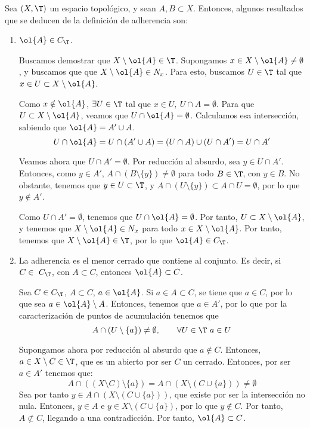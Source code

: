 Sea $(X,\T)$ un espacio topológico, y sean $A,B\subset X$. Entonces, algunos resultados que se deducen de la definición de adherencia son:
\begin{enumerate}
    \item $\ol{A}\in C_\T$.

    Buscamos demostrar que $X\setminus \ol{A}\in \T$. Supongamos $x\in X\setminus \ol{A}\neq \emptyset$, y buscamos que que $X\setminus \ol{A}\in N_x$. Para esto, buscamos $U\in \T$ tal que $x\in U\subset X\setminus \ol{A}$.
    
    Como $x\notin \ol{A}$, $\exists U\in \T$ tal que $x\in U,~U\cap A=\emptyset$. Para que $U\subset X\setminus \ol{A}$, veamos que $U\cap \ol{A}=\emptyset$.  Calculamos esa intersección, sabiendo que $\ol{A}=A'\cup A$.
    \begin{equation*}
        U\cap \ol{A} = U\cap (A'\cup A) = (U\cap A)\cup (U\cap A')=U\cap A'
    \end{equation*}

    Veamos ahora que $U\cap A'=\emptyset$. Por reducción al absurdo, sea $y\in U\cap A'$. Entonces, como $y\in A'$, $A\cap (B\setminus \{y\})\neq \emptyset$ para todo $B\in \T$, con $y\in B$. No obstante, tenemos que $y\in U\subset \T$, y $A\cap (U\setminus \{y\})\subset A\cap U=\emptyset$, por lo que $y\notin A'$.

    Como $U\cap A'=\emptyset$, tenemos que $U\cap \ol{A}=\emptyset$. Por tanto, $U\subset X\setminus \ol{A}$, y tenemos que $X\setminus \ol{A}\in N_x$ para todo $x\in X\setminus \ol{A}$. Por tanto, tenemos que $X\setminus \ol{A}\in \T$, por lo que $\ol{A}\in C_\T$.
    
    \item La adherencia es el menor cerrado que contiene al conjunto. Es decir, si $C\in~C_\T$, con $A\subset C$, entonces $\ol{A}\subset C$.

    Sea $C\in C_\T$, $A\subset C$, $a\in \ol{A}$. Si $a\in A\subset C$, se tiene que $a\in C$, por lo que sea $a\in \ol{A}\setminus A$. Entonces, tenemos que $a\in A'$, por lo que por la caracterización de puntos de acumulación tenemos que
    \begin{equation*}
        A\cap (U\setminus \{a\})\neq \emptyset,\qquad \forall U\in \T~a\in U
    \end{equation*}

    Supongamos ahora por reducción al absurdo que $a\notin C$. Entonces, $a\in X\setminus C\in \T$, que es un abierto por ser $C$ un cerrado. Entonces, por ser $a\in A'$ tenemos que:
    \begin{equation*}
        A\cap ((X\setminus C)\setminus \{a\}) = A\cap (X\setminus (C\cup \{a\})) \neq \emptyset
    \end{equation*}
    Sea por tanto $y\in A\cap (X\setminus (C\cup \{a\}))$, que existe por ser la intersección no nula. Entonces, $y\in A$ e $y\in X\setminus (C\cup \{a\})$, por lo que $y\notin C$. Por tanto, $A\not\subset C$, llegando a una contradicción. Por tanto, $\ol{A} \subset C$.
    

\end{enumerate}
